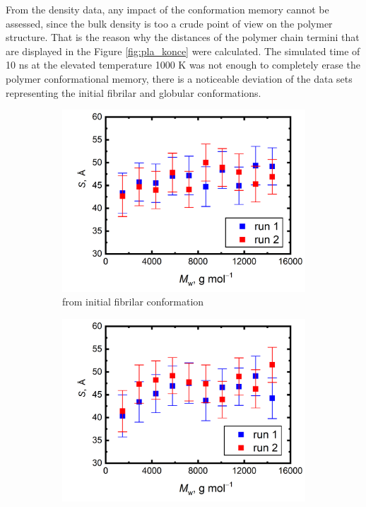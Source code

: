 From the density data, any impact of the conformation memory cannot be assessed, since the bulk density is too a crude point of view on the polymer structure. That is the reason why the distances of the polymer chain termini that are displayed in the Figure \ref{fig:pla_konce} were calculated. The simulated time of 10 ns at the elevated temperature 1000 K was not enough to completely erase the polymer conformational memory, there is a noticeable deviation of the data sets representing the initial fibrilar and globular conformations.

\begin{figure}[htb!]
	\begin{subfigure}{0.5\textwidth}
		\includegraphics[width=1.0\linewidth]{img/pla_linear_konce.png} 
		\caption{from initial fibrilar conformation}
		\vspace{-0.2cm}
		\label{fig:subim1}
	\end{subfigure}
	\begin{subfigure}{0.5\textwidth}
		\includegraphics[width=1.0\linewidth]{img/pla_glob_konce.png}

\end{subfigure}
\end{figure}
